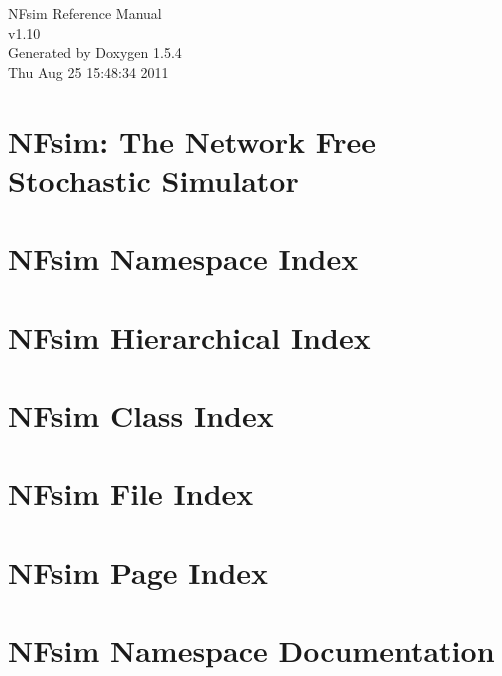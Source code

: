 \documentclass[a4paper]{book}
\begin{document}
\begin{titlepage}
\vspace*{7cm}
\begin{center}
{\Large NFsim Reference Manual\\[1ex]\large v1.10 }\\
\vspace*{1cm}
{\large Generated by Doxygen 1.5.4}\\
\vspace*{0.5cm}
{\small Thu Aug 25 15:48:34 2011}\\
\end{center}
\end{titlepage}
\clearemptydoublepage
{}
\tableofcontents
\clearemptydoublepage
{}
\chapter{NFsim: The Network Free Stochastic Simulator }
\label{index}
\chapter{NFsim Namespace Index}

\chapter{NFsim Hierarchical Index}

\chapter{NFsim Class Index}

\chapter{NFsim File Index}

\chapter{NFsim Page Index}

\chapter{NFsim Namespace Documentation}









\end{document}
